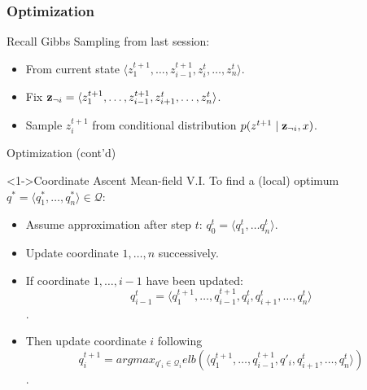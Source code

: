 \documentclass{beamer}
\begin{document}
\begin{frame}
  \frametitle{Optimization}
  
  \begin{exampleblock}{Recall Gibbs Sampling from last session:}
    \begin{itemize}
    \item<2-> From current state $\langle z^{t+1}_1, \dots, z^{t+1}_{i-1}, z^{t}_{i}, \dots, z^{t}_n \rangle$.
    \item<3-> Fix ${\bf z}_{\neg i} = \langle z^{t+1}_1, \dots, z^{t+1}_{i-1}, z^t_{i+1}, \dots, z^t_n \rangle$.
    \item<4-> Sample $z^{t+1}_i$ from conditional distribution $p(z^{t+1} \mid {\bf z}_{\neg i}, x)$.
    \end{itemize}
    \alert{}
  \end{exampleblock}
\end{frame}

\begin{frame}{Optimization (cont'd)}
  \begin{block}<1->{Coordinate Ascent Mean-field V.I.}
    To find a (local) optimum $q^* = \langle q^*_1, \dots, q^*_n  \rangle \in \mathcal{Q}$:
    \begin{itemize}
    \item<2-> Assume approximation after step $t$: $q^t_0 = \langle q^t_1, \dots q^t_n  \rangle$.
    \item<3-> Update coordinate $1,\dots, n$ successively.
    \item<4-> If coordinate $1, \dots, i-1$ have been updated: \[q^t_{i-1} = \langle q^{t+1}_1, \dots, q^{t+1}_{i-1}, q^t_i,q^{t}_{i+1},\dots, q^{t}_n  \rangle\].
    \item<5-> Then update coordinate $i$ following \[q^{t+1}_{i} = argmax_{q'_i \in \mathcal{Q}_i} elb(\langle q^{t+1}_1, \dots, q^{t+1}_{i-1}, q'_i,q^t_{i+1},\dots, q^{t}_n  \rangle)\].
    \end{itemize}
    \alert{}
  \end{block}
\end{frame}
\end{document}
